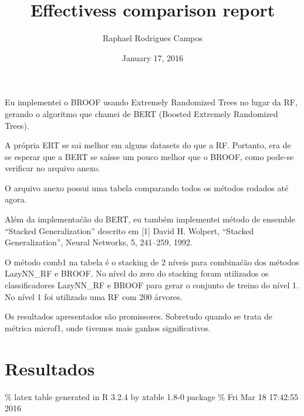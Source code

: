 \documentclass[]{article}
\title{Effectivess comparison report}
\author{Raphael Rodrigues Campos}
\date{January 17, 2016}
\begin{document}
\maketitle


Eu implementei o BROOF usando Extremely Randomized Trees no lugar da RF,
gerando o algoritmo que chamei de BERT (Boosted Extremely Randomized
Trees).

A própria ERT se sai melhor em alguns datasets do que a RF. Portanto,
era de se esperar que a BERT se saísse um pouco melhor que o BROOF, como
pode-se verificar no arquivo anexo.

O arquivo anexo possui uma tabela comparando todos os métodos rodados
até agora.

Além da implementaćão do BERT, eu também implementei método de ensemble
``Stacked Generalization'' descrito em {[}1{]} David H. Wolpert,
``Stacked Generalization'', Neural Networks, 5, 241--259, 1992.

O método comb1 na tabela é o stacking de 2 níveis para combinaćão dos
métodos LazyNN\_RF e BROOF. No nível do zero do stacking foram
utilizados os classificadores LazyNN\_RF e BROOF para gerar o conjunto
de treino do nível 1. No nível 1 foi utilizado uma RF com 200 árvores.

Os resultados apresentados são promissores. Sobretudo quando se trata de
métrica microf1, onde tivemos mais ganhos significativos.

\section{Resultados}\label{resultados}

\% latex table generated in R 3.2.4 by xtable 1.8-0 package \% Fri Mar
18 17:42:55 2016
\end{document}
